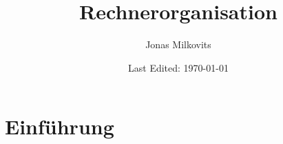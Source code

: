 


\begin{titlepage}
  \title{Rechnerorganisation} %
  \author{Jonas Milkovits}
  \date{Last Edited: \today}
\end{titlepage}



\maketitle
{} %
\tableofcontents
\clearpage
{} %

\section{Einführung}

